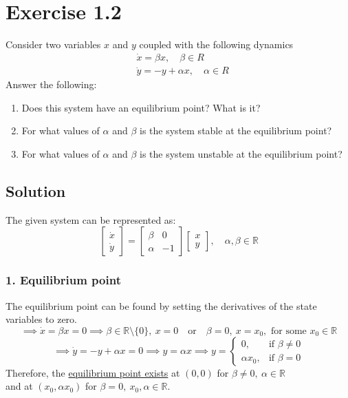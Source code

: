 \section*{Exercise 1.2}

Consider two variables \( x \) and \( y \) coupled with the following dynamics
\begin{align*}
     & \dot{x}=\beta x, \quad \beta \in R      \\
     & \dot{y}=-y+\alpha x, \quad \alpha \in R
\end{align*}
Answer the following:
\begin{enumerate}[noitemsep]
    \item Does this system have an equilibrium point? What is it?
    \item For what values of \( \alpha \) and \( \beta \) is the system stable at the equilibrium point?
    \item For what values of \( \alpha \) and \( \beta \) is the system unstable at the equilibrium point?
\end{enumerate}

\subsection*{Solution}

The given system can be represented as:
\begin{equation*}
    \begin{bmatrix}
        \dot{x} \\
        \dot{y}
    \end{bmatrix}
    =
    \begin{bmatrix}
        \beta  & 0  \\
        \alpha & -1
    \end{bmatrix}
    \begin{bmatrix}
        x \\
        y
    \end{bmatrix}
    ,\quad \alpha, \beta \in \mathbb{R}
\end{equation*}

\subsubsection*{1. Equilibrium point}

The equilibrium point can be found by setting the derivatives of the state variables to zero.
\[
    \implies
    \dot{x} = \beta x = 0
    \implies
    \beta \in \mathbb{R}\setminus \{0\}, \ x = 0
    \quad \text{or} \quad
    \beta = 0, \ x = x_0, \text{ for some } x_0 \in \mathbb{R}
\]
\[
    \implies
    \dot{y} = -y + \alpha x = 0
    \implies
    y = \alpha x
    \implies
    y = \begin{cases}
        0,          & \text{if } \beta \neq 0 \\
        \alpha x_0, & \text{if } \beta = 0
    \end{cases}
\]
Therefore, the \underline{equilibrium point exists} at \( \boxed{ (0, 0) } \) for \( \beta \neq 0, \ \alpha \in \mathbb{R} \) \\
and at \( \boxed{ (x_0, \alpha x_0) } \) for \( \beta = 0, \ x_0, \alpha \in \mathbb{R} \).

